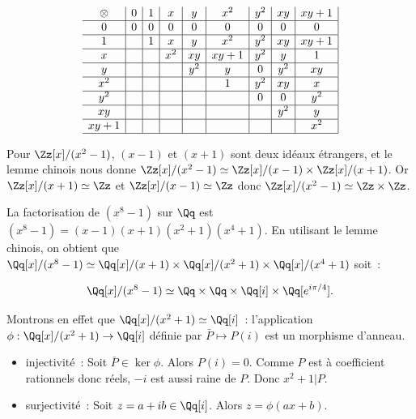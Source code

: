 {\begin{enumerate}
{$$
\begin{array}{c|c|c|c|c|c|c|c|c|c|c|}
\otimes   &   0 &   1 &   x &   y & x^2  & y^2  & xy   & xy+1\\\hline
0         &   0 &   0 &   0 &   0 & 0    & 0    & 0    & 0   \\\hline
1         &     &   1 &   x &   y & x^2  & y^2  & xy   & xy+1\\\hline
x         &     &     & x^2 &  xy & xy+1 & y^2  & y    & 1   \\\hline
y         &     &     &     & y^2 &  y   & 0    & y^2  & xy  \\\hline
x^2       &     &     &     &     &  1   & y^2  & xy   & x   \\\hline
y^2       &     &     &     &     &      & 0    & 0    & y^2 \\\hline
xy        &     &     &     &     &      &      & y^2  & y   \\\hline
xy+1      &     &     &     &     &      &      &      & x^2 \\\hline
\end{array}
$$
 
Pour $\Zz[x]/(x^{2}-1)$, $(x-1)$ et $(x+1)$ sont deux idéaux étrangers,
et le lemme chinois nous donne $\Zz[x]/(x^{2}-1)\simeq
\Zz[x]/(x-1)\times\Zz[x]/(x+1)$. Or $\Zz[x]/(x+1)\simeq\Zz$ et
$\Zz[x]/(x-1)\simeq\Zz$ donc $\Zz[x]/(x^{2}-1)\simeq\Zz\times\Zz$.


La factorisation de $(x^{8}-1)$ sur $\Qq$ est
$(x^{8}-1)=(x-1)(x+1)(x^{2}+1)(x^{4}+1)$. En utilisant le lemme chinois,
on obtient que $\Qq[x]/(x^{8}-1)\simeq \Qq[x]/(x+1)\times
\Qq[x]/(x^{2}+1)\times \Qq[x]/(x^{4}+1)$ soit~:

$$
\Qq[x]/(x^{8}-1)\simeq
\Qq\times\Qq\times\Qq[i]\times\Qq[e^{i\pi/4}].
$$

Montrons en effet que $\Qq[x]/(x^{2}+1)\simeq\Qq[i]$~: l'application
$\phi:\Qq[x]/(x^{2}+1)\to \Qq[i]$ définie par $\bar P\mapsto P(i)$ est un
morphisme d'anneau.
\begin{itemize}
\item injectivité~:
  Soit $\bar{P}\in\ker\phi$. Alors $P(i)=0$. Comme $P$ est à coefficient
  rationnels donc réels, $-i$ est aussi raine de $P$. Donc $x^{2}+1|P$.
\item surjectivité~:
  Soit $z=a+ib\in\Qq[i]$. Alors $z=\phi(ax+b)$.
\end{itemize}

\smallskip

}
\end{enumerate}}
